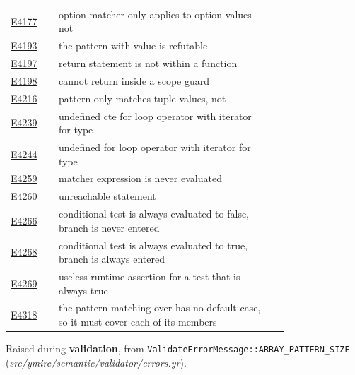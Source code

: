 \begin{longtable}{@{}l p{0.78\linewidth} r@{}}
\hyperref[sec:codes:e4177]{E4177} & option matcher \errhole{} only applies to option values not \errhole{} & \pageref{sec:codes:e4177}\\
\hyperref[sec:codes:e4193]{E4193} & the pattern \errhole{} with value \errhole{} is refutable & \pageref{sec:codes:e4193}\\
\hyperref[sec:codes:e4197]{E4197} & return statement is not within a function & \pageref{sec:codes:e4197}\\
\hyperref[sec:codes:e4198]{E4198} & cannot return inside a scope guard & \pageref{sec:codes:e4198}\\
\hyperref[sec:codes:e4216]{E4216} & pattern \errhole{} only matches tuple values, not \errhole{} & \pageref{sec:codes:e4216}\\
\hyperref[sec:codes:e4239]{E4239} & undefined cte for loop operator with \errhole{} iterator for type \errhole{} & \pageref{sec:codes:e4239}\\
\hyperref[sec:codes:e4244]{E4244} & undefined for loop operator with \errhole{} iterator for type \errhole{} & \pageref{sec:codes:e4244}\\
\hyperref[sec:codes:e4259]{E4259} & matcher expression is never evaluated & \pageref{sec:codes:e4259}\\
\hyperref[sec:codes:e4260]{E4260} & unreachable statement & \pageref{sec:codes:e4260}\\
\hyperref[sec:codes:e4266]{E4266} & conditional test is always evaluated to false, branch is never entered & \pageref{sec:codes:e4266}\\
\hyperref[sec:codes:e4268]{E4268} & conditional test is always evaluated to true, branch is always entered & \pageref{sec:codes:e4268}\\
\hyperref[sec:codes:e4269]{E4269} & useless runtime assertion for a test that is always true & \pageref{sec:codes:e4269}\\
\hyperref[sec:codes:e4318]{E4318} & the pattern matching over \errhole{} has no default case, so it must cover each of its members & \pageref{sec:codes:e4318}\\
\bottomrule
\end{longtable}

\label{sec:codes:e4006}

Raised during \textbf{validation}, from \texttt{ValidateErrorMessage::\allowbreak{}ARRAY\_\allowbreak{}PATTERN\_\allowbreak{}SIZE} (\textit{src/\allowbreak{}ymirc/\allowbreak{}semantic/\allowbreak{}validator/\allowbreak{}errors.yr}).

